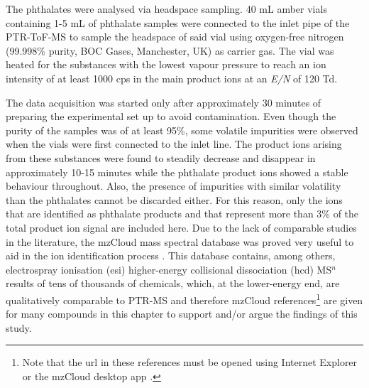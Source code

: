 
The phthalates were analysed via headspace sampling. 
%
40 mL amber vials containing 1-5 mL of  phthalate samples were connected to the inlet pipe of the PTR-ToF-MS to sample the headspace of said vial using oxygen-free nitrogen (99.998\% purity, BOC Gases, Manchester, UK) as carrier gas.
%
The vial was heated for the substances with the lowest vapour pressure  %
to reach an ion intensity of at least 1000 %
 cps in the main product ions  at an \textit{E/N} of 120 Td.
%



The data acquisition was started only after approximately 30 minutes of preparing the experimental set up to avoid contamination.
%
Even though the purity of the samples was of at least 95\%, some volatile impurities were observed when the vials were first connected to the inlet line.
%
The product ions arising from these substances were found to steadily decrease and disappear in approximately 10-15 minutes while the phthalate product ions showed a stable behaviour throughout.
%
Also, the presence of impurities with similar volatility than the phthalates cannot be discarded either. 
%
For this reason, only the  ions that are identified as phthalate products and that represent more than 3\% of the total product ion signal are included here.
%
Due to the lack of comparable studies in the literature, the mzCloud mass spectral database was proved very useful to aid in the ion identification process \cite{mzcloudd}.
%
 This database contains, among others, electrospray ionisation (\acrshort{esi}) higher-energy collisional dissociation (\acrshort{hcd}) MS$^n$ results of tens of thousands of chemicals, which, at the lower-energy end,  are qualitatively comparable to PTR-MS and therefore mzCloud references\footnote{Note that the url in these references must be opened using Internet Explorer or the mzCloud desktop app \cite{mzcloudd}.}  are given for many compounds in this chapter to support and/or argue the findings of this study.
 


